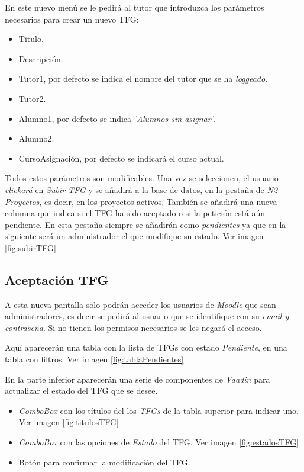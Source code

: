 En este nuevo menú se le pedirá al tutor que introduzca los parámetros necesarios para crear un nuevo TFG:

\begin{itemize}
	\item Titulo.
	\item Descripción.
	\item Tutor1, por defecto se indica el nombre del tutor que se ha \emph{loggeado}.
	\item Tutor2.
	\item Alumno1, por defecto se indica \emph{'Alumnos sin asignar'}.
	\item Alumno2.
	\item CursoAsignación, por defecto se indicará el curso actual.
\end{itemize}

Todos estos parámetros son modificables. Una vez se seleccionen, el usuario \emph{clickará} en \emph{Subir TFG} y se añadirá a la base de datos, en la pestaña de \emph{N2 Proyectos}, es decir, en los proyectos activos.
También se añadirá una nueva columna que indica si el TFG ha sido aceptado o si la petición está aún pendiente. En esta pestaña siempre se añadirán como \emph{pendientes} ya que en la siguiente será un administrador el que modifique su estado. Ver imagen \ref{fig:subirTFG}


\subsection{Aceptación TFG}

A esta nueva pantalla solo podrán acceder los usuarios de \emph{Moodle} que sean administradores, es decir se pedirá al usuario que se identifique con su \emph{email y contraseña}. Si no tienen los permisos necesarios se les negará el acceso.

Aquí aparecerán una tabla con la lista de TFGs con estado \emph{Pendiente}, en una tabla con filtros. Ver imagen \ref{fig:tablaPendientes}


En la parte inferior aparecerán una serie de componentes de \emph{Vaadin} para actualizar el estado del TFG que se desee.

\begin{itemize}
	\item \emph{ComboBox} con los títulos del los \emph{TFGs} de la tabla superior para indicar uno. Ver imagen \ref{fig:titulosTFG}
	\item \emph{ComboBox} con las opciones de \emph{Estado} del TFG. Ver imagen \ref{fig:estadosTFG}
	\item Botón para confirmar la modificación del TFG.
\end{itemize}

